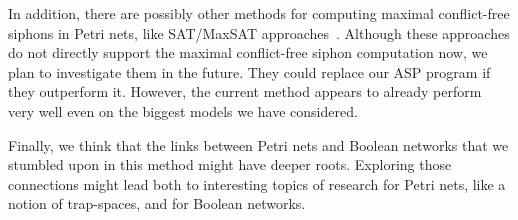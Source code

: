 \documentclass[preprint,12pt]{elsarticle}
\begin{document}
In addition, there are possibly other methods for computing maximal conflict-free siphons in Petri nets, like SAT/MaxSAT approaches~\cite{nabli2016enumerating}. Although these approaches do not directly support the maximal conflict-free siphon computation now, we plan to investigate them in the future. They could replace our ASP program if they outperform it.
However, the current method appears to already perform very well even on the biggest models we have considered.

Finally, we think that the links between Petri nets and Boolean networks that we stumbled upon in this method might have deeper roots. Exploring those connections might lead both to interesting topics of research for Petri nets, like a notion of trap-spaces, and for Boolean networks.




 






\end{document}

